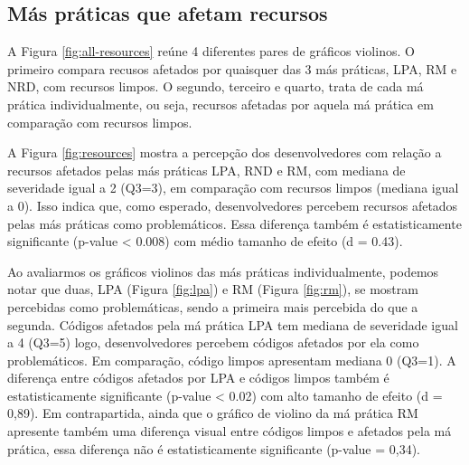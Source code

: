 
\subsection{Más práticas que afetam recursos}

A Figura \ref{fig:all-resources} reúne 4 diferentes pares de gráficos violinos. O primeiro compara recusos afetados por quaisquer das 3 más práticas, LPA, RM e NRD, com recursos limpos. O segundo, terceiro e quarto, trata de cada má prática individualmente, ou seja, recursos afetadas por aquela má prática em comparação com recursos limpos. 

A Figura \ref{fig:resources} mostra a percepção dos desenvolvedores com relação a recursos afetados pelas más práticas LPA, RND e RM, com mediana de severidade igual a 2 (Q3=3), em comparação com recursos limpos (mediana igual a 0). Isso indica que, como esperado, desenvolvedores percebem recursos afetados pelas más práticas como problemáticos. Essa diferença também é estatisticamente significante (p-value < 0.008) com médio tamanho de efeito (d = 0.43).


Ao avaliarmos os gráficos violinos das más práticas individualmente, podemos notar que duas, LPA (Figura \ref{fig:lpa}) e RM (Figura \ref{fig:rm}), se mostram percebidas como problemáticas, sendo a primeira mais percebida do que a segunda. Códigos afetados pela má prática LPA tem mediana de severidade igual a 4 (Q3=5) logo, desenvolvedores percebem códigos afetados por ela como problemáticos. Em comparação, código limpos apresentam mediana 0 (Q3=1). A diferença entre códigos afetados por LPA e códigos limpos também é estatisticamente significante (p-value < 0.02) com alto tamanho de efeito (d = 0,89). Em contrapartida, ainda que o gráfico de violino da má prática RM apresente também uma diferença visual entre códigos limpos e afetados pela má prática, essa diferença não é estatisticamente significante (p-value = 0,34).

